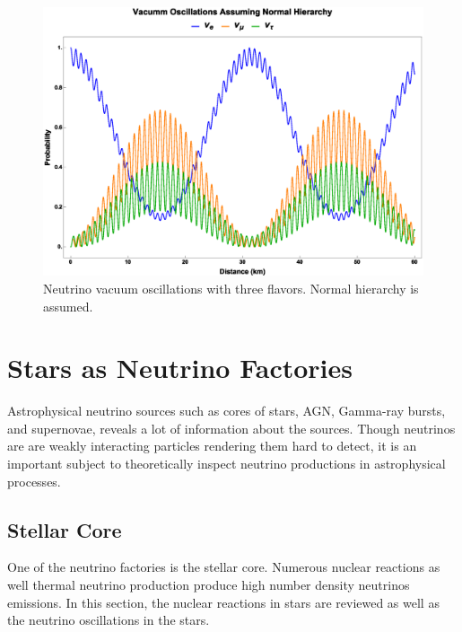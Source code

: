 \begin{figure}
    \centering
    \includegraphics[width=\textwidth]{chapters/assets/basics/vacuum-oscillations-3-flavor.eps}
    \caption{Neutrino vacuum oscillations with three flavors. Normal hierarchy is assumed.}
    \label{chap:basics-section:neutrinos-fig:vacuum-3-flavor-osc}
\end{figure}



\section{\label{chap:basics-section:astro}Stars as Neutrino Factories}

Astrophysical neutrino sources such as cores of stars, AGN, Gamma-ray bursts, and supernovae, reveals a lot of information about the sources. Though neutrinos are are weakly interacting particles rendering them hard to detect, it is an important subject to theoretically inspect neutrino productions in astrophysical processes.






\subsection{Stellar Core}

One of the neutrino factories is the stellar core. Numerous nuclear reactions as well thermal neutrino production produce high number density neutrinos emissions. In this section, the nuclear reactions in stars are reviewed as well as the neutrino oscillations in the stars.


